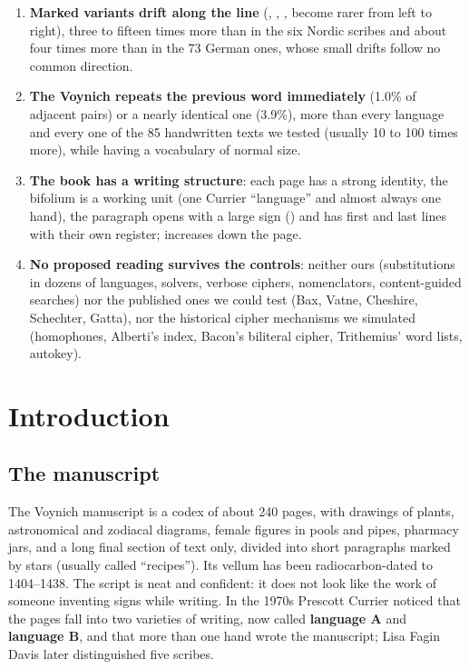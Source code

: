 \begin{enumerate}[label=\textbf{\arabic*.}]
  , , the scribe tends to repeat the same choice for two or three words, \emph{whatever word is
  being written}. It is not copying of similar words, not position in the line, it is separate for each choice and
  identical in all the hands of the manuscript: a rule of the writing system. We did not find it in any of the 79
  medieval scribes (six Nordic, 73 German) nor in the Copiale copyist.
\item \textbf{Marked variants drift along the line} (, , ,  become rarer from left to
  right), three to fifteen times more than in the six Nordic scribes and about four times more than in the 73 German
  ones, whose small drifts follow no common direction.
\item \textbf{The Voynich repeats the previous word immediately} (1.0\% of adjacent pairs) or a nearly identical one
  (3.9\%), more than every language and every one of the 85 handwritten texts we tested (usually 10 to 100 times more),
  while having a vocabulary of normal size.
\item \textbf{The book has a writing structure}: each page has a strong identity, the bifolium is a working unit (one
  Currier ``language'' and almost always one hand), the paragraph opens with a large sign () and has first and
  last lines with their own register;  increases down the page.
\item \textbf{No proposed reading survives the controls}: neither ours (substitutions in dozens of languages, solvers,
  verbose ciphers, nomenclators, content-guided searches) nor the published ones we could test (Bax, Vatne, Cheshire,
  Schechter, Gatta), nor the historical cipher mechanisms we simulated (homophones, Alberti's index, Bacon's biliteral
  cipher, Trithemius' word lists, autokey).
\end{enumerate}

\section{Introduction}

\subsection{The manuscript}

The Voynich manuscript is a codex of about 240 pages, with drawings of plants, astronomical and zodiacal diagrams,
female figures in pools and pipes, pharmacy jars, and a long final section of text only, divided into short paragraphs
marked by stars (usually called ``recipes''). Its vellum has been radiocarbon-dated to 1404--1438. The script is neat and confident: it does not look like the work of
someone inventing signs while writing. In the 1970s Prescott Currier noticed that the pages fall into two varieties of
writing, now called \textbf{language A} and \textbf{language B}, and that more than one hand wrote the manuscript;
Lisa Fagin Davis later distinguished five scribes.

